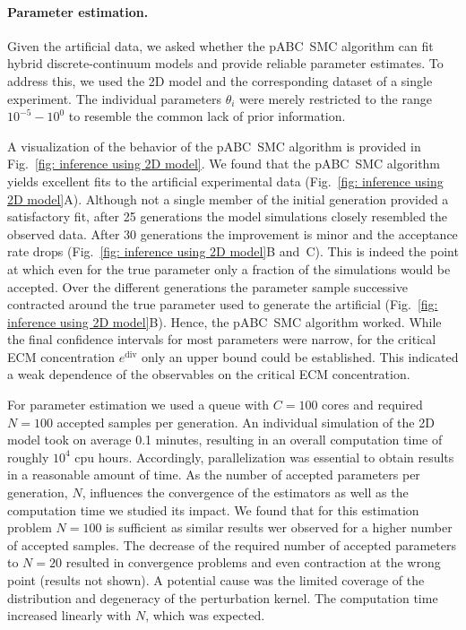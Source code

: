 \documentclass[10pt,letterpaper]{article}
\newcommand{\nj}[1]{{\color{blue}#1}}
\begin{document}
\paragraph{Parameter estimation.}
Given the artificial data, we asked whether the pABC~SMC algorithm can fit hybrid discrete-continuum models and provide reliable parameter estimates. To address this, we used the 2D model and the corresponding dataset \nj{of a single experiment}. The individual parameters $\theta_i$ were merely restricted to the range $10^{-5} - 10^0$ to resemble the common lack of prior information.

A visualization of the behavior of the pABC~SMC algorithm is provided in Fig.~\ref{fig: inference using 2D model}. We found that the pABC~SMC algorithm yields excellent fits to the artificial experimental data (Fig.~\ref{fig: inference using 2D model}A). Although not a single member of the initial generation provided a satisfactory fit, after 25 generations the model simulations closely resembled the observed data. After 30 generations the improvement is minor and the acceptance rate drops (Fig.~\ref{fig: inference using 2D model}B and~C). This is indeed the point at which even for the true parameter only a fraction of the simulations would be accepted. Over the different generations the parameter sample successive contracted around the true parameter used to generate the artificial (Fig.~\ref{fig: inference using 2D model}B). Hence, the pABC~SMC algorithm worked. While the final confidence intervals for most parameters were narrow, for the critical ECM concentration $e^{\text{div}}$ only an upper bound could be established. This indicated a weak dependence of the observables on the critical ECM concentration.

For parameter estimation we used a queue with $C = 100$ cores and required $N = 100$ accepted samples per generation. An individual simulation of the 2D model took on average \nj{0.1} minutes, resulting in an overall computation time of roughly \nj{$10^{4}$} cpu hours. Accordingly, parallelization was essential to obtain results in a reasonable amount of time. As the number of accepted parameters per generation, $N$, influences the convergence of the estimators as well as the computation time we studied its impact. We found that for this estimation problem $N = 100$ is sufficient as similar results wer observed for a higher number of accepted samples. The decrease of the required number of accepted parameters to $N = 20$ resulted in convergence problems and even contraction at the wrong point (results not shown). A potential cause was the limited coverage of the distribution and degeneracy of the perturbation kernel. The computation time increased linearly with $N$, which was expected.
\end{document}
